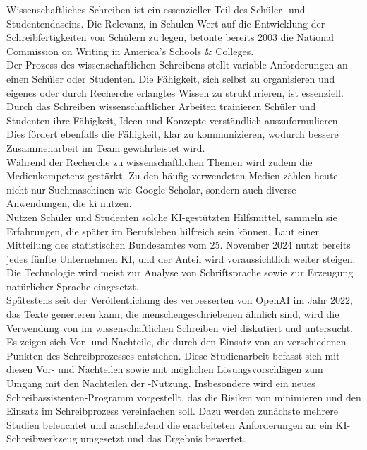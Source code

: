 \documentclass[../main.tex]{subfiles}
\begin{document}
Wissenschaftliches Schreiben ist ein essenzieller Teil des Schüler- und Studentendaseins. Die Relevanz, in Schulen Wert auf die Entwicklung der Schreibfertigkeiten von Schülern zu legen, 
betonte bereits 2003 die National Commission on Writing in America’s Schools \& Colleges\cite{nationalcommissionwriting}. \\ Der Prozess des wissenschaftlichen Schreibens stellt variable 
Anforderungen an einen Schüler oder Studenten. Die Fähigkeit, sich selbst zu organisieren und eigenes oder durch Recherche erlangtes Wissen zu strukturieren, ist essenziell. Durch das 
Schreiben wissenschaftlicher Arbeiten trainieren Schüler und Studenten ihre Fähigkeit, Ideen und Konzepte verständlich auszuformulieren. Dies fördert ebenfalls die Fähigkeit, klar zu 
kommunizieren, wodurch bessere Zusammenarbeit im Team gewährleistet wird.\cite{nationalcommissionwriting,teachers,humanWritingToAi} \\ 
Während der Recherche zu wissenschaftlichen Themen wird zudem die Medienkompetenz gestärkt. Zu den häufig verwendeten Medien zählen heute nicht nur Suchmaschinen wie Google Scholar, sondern 
auch diverse Anwendungen, die \gls{ki} nutzen.\\ Nutzen Schüler und Studenten solche KI-gestützten Hilfsmittel, sammeln sie Erfahrungen, die später im Berufsleben hilfreich sein können. Laut 
einer Mitteilung des statistischen Bundesamtes vom 25. November 2024 nutzt bereits jedes fünfte Unternehmen KI, und der Anteil wird voraussichtlich weiter steigen\cite{statistischesBundesamt}. 
Die Technologie wird meist zur Analyse von Schriftsprache sowie zur Erzeugung natürlicher Sprache eingesetzt\cite{statistischesBundesamt}.\\ 
Spätestens seit der Veröffentlichung des verbesserten  von OpenAI im Jahr 2022, das Texte generieren kann, die menschengeschriebenen ähnlich sind, wird die Verwendung von 
 im wissenschaftlichen Schreiben viel diskutiert und untersucht.\cite{humanWritingToAi,ZukunftWissenschaftlichesPublizieren}\\
Es zeigen sich Vor- und Nachteile, die durch den Einsatz von  an verschiedenen Punkten des Schreibprozesses entstehen. Diese Studienarbeit befasst sich mit diesen 
Vor- und Nachteilen sowie mit möglichen Lösungsvorschlägen zum Umgang mit den Nachteilen der -Nutzung. Insbesondere wird ein neues Schreibassistenten-Programm vorgestellt, das 
die Risiken von  minimieren und den Einsatz im Schreibprozess vereinfachen soll. Dazu werden zunächste mehrere Studien beleuchtet und anschließend die erarbeiteten Anforderungen an ein KI-Schreibwerkzeug
umgesetzt und das Ergebnis bewertet.
\end{document}
